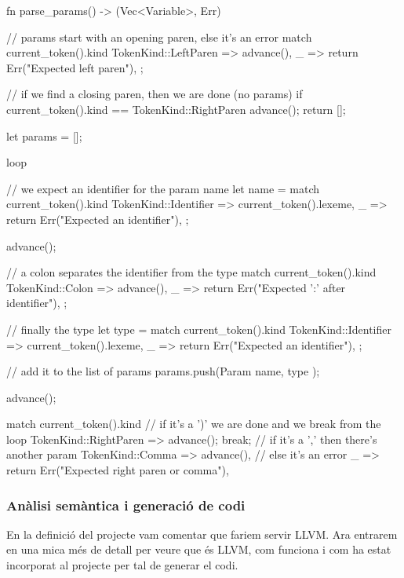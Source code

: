﻿\documentclass{article}
\begin{document}
\begin{code}
    fn parse_params() -> (Vec<Variable>, Err) {
        // params start with an opening paren, else it's an error
        match current_token().kind {
            TokenKind::LeftParen => advance(),
            _ => return Err("Expected left paren"),
        };

        // if we find a closing paren, then we are done (no params)
        if current_token().kind == TokenKind::RightParen {
            advance();
            return [];
        }

        let params = [];

        loop {
            // we expect an identifier for the param name
            let name = match current_token().kind {
                TokenKind::Identifier => current_token().lexeme,
                _ => return Err("Expected an identifier"),
            };

            advance();

            // a colon separates the identifier from the type
            match current_token().kind {
                TokenKind::Colon => advance(),
                _ => return Err("Expected ':' after identifier"),
            };

            // finally the type
            let type = match current_token().kind {
                TokenKind::Identifier => current_token().lexeme,
                _ => return Err("Expected an identifier"),
            };

            // add it to the list of params
            params.push(Param { name, type });

            advance();

            match current_token().kind {
                // if it's a ')' we are done and we break from the loop
                TokenKind::RightParen => {
                    advance();
                    break;
                }
                // if it's a ',' then there's another param
                TokenKind::Comma => advance(),
                // else it's an error
                _ => return Err("Expected right paren or comma"),
            }
        }
    }
\end{code}

\subsubsection{Anàlisi semàntica i generació de codi}
En la definició del projecte vam comentar que fariem servir LLVM. Ara entrarem
en una mica més de detall per veure que és LLVM, com funciona i com ha estat
incorporat al projecte per tal de generar el codi.
\end{document}
